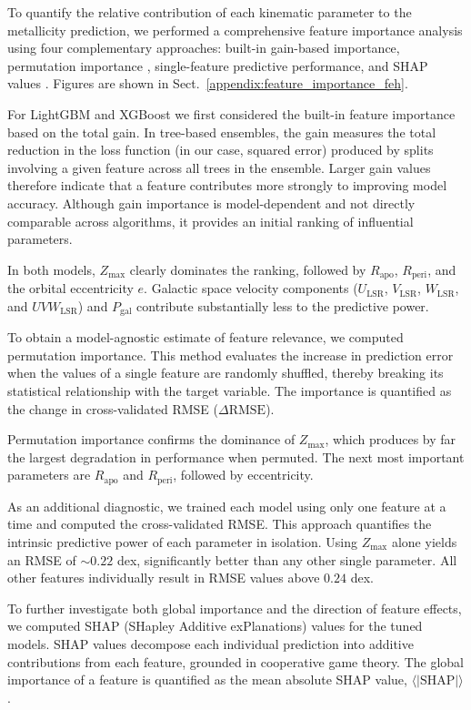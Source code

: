 \documentclass{aa}
\begin{document}
To quantify the relative contribution of each kinematic parameter to the metallicity prediction, we performed a comprehensive feature importance analysis using four complementary approaches: built-in gain-based importance, permutation importance \citep{breiman2001}, single-feature predictive performance, and SHAP values \citep{Lundberg-17, Lundberg2020}. Figures are shown in Sect.~\ref{appendix:feature_importance_feh}.

For LightGBM and XGBoost we first considered the built-in feature importance based on the total gain. In tree-based ensembles, the gain measures the total reduction in the loss function (in our case, squared error) produced by splits involving a given feature across all trees in the ensemble. Larger gain values therefore indicate that a feature contributes more strongly to improving model accuracy. Although gain importance is model-dependent and not directly comparable across algorithms, it provides an initial ranking of influential parameters.

In both models, $Z_{\max}$ clearly dominates the ranking, followed by $R_{\mathrm{apo}}$, $R_{\mathrm{peri}}$, and the orbital eccentricity $e$. Galactic space velocity components ($U_{\mathrm{LSR}}$, $V_{\mathrm{LSR}}$, $W_{\mathrm{LSR}}$, and $UVW_{\mathrm{LSR}}$) and $P_{\mathrm{gal}}$ contribute substantially less to the predictive power.


To obtain a model-agnostic estimate of feature relevance, we computed permutation importance. This method evaluates the increase in prediction error when the values of a single feature are randomly shuffled, thereby breaking its statistical relationship with the target variable. The importance is quantified as the change in cross-validated RMSE ($\Delta \mathrm{RMSE}$).

Permutation importance confirms the dominance of $Z_{\max}$, which produces by far the largest degradation in performance when permuted. The next most important parameters are $R_{\mathrm{apo}}$ and $R_{\mathrm{peri}}$, followed by eccentricity.

As an additional diagnostic, we trained each model using only one feature at a time and computed the cross-validated RMSE. This approach quantifies the intrinsic predictive power of each parameter in isolation. Using $Z_{\max}$ alone yields an RMSE of $\sim 0.22$ dex, significantly better than any other single parameter. All other features individually result in RMSE values above $0.24$ dex.

To further investigate both global importance and the direction of feature effects, we computed SHAP (SHapley Additive exPlanations) values for the tuned models. SHAP values decompose each individual prediction into additive contributions from each feature, grounded in cooperative game theory. The global importance of a feature is quantified as the mean absolute SHAP value, $\langle |\mathrm{SHAP}| \rangle$.
\end{document}
